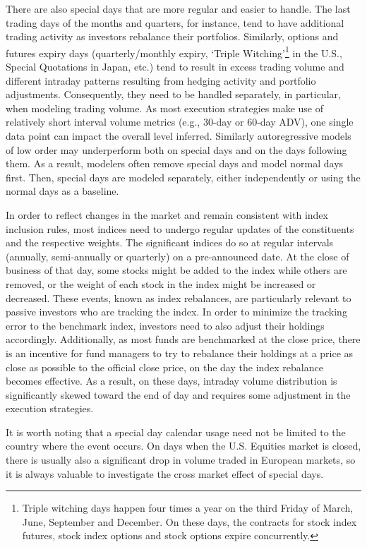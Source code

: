 \begin{itemize}
There are also special days that are more regular and easier to handle. The last trading days of the months and quarters, for instance, tend to have additional trading activity as investors rebalance their portfolios. Similarly, options and futures expiry days (quarterly/monthly expiry, `Triple Witching'\footnote{Triple witching days happen four times a year on the third Friday of March, June, September and December. On these days, the contracts for stock index futures, stock index options and stock options expire concurrently.} in the U.S., Special Quotations in Japan, etc.) tend to result in excess trading volume and different intraday patterns resulting from hedging activity and portfolio adjustments. Consequently, they need to be handled separately, in particular, when modeling trading volume. As most execution strategies make use of relatively short interval volume metrics (e.g., 30-day or 60-day ADV), one single data point can impact the overall level inferred. Similarly autoregressive models of low order may underperform both on special days and on the days following them. As a result, modelers often remove special days and model normal days first. Then, special days are modeled separately, either independently or using the normal days as a baseline. 


In order to reflect changes in the market and remain consistent with index inclusion rules, most indices need to undergo regular updates of the constituents and the respective weights. The significant indices do so at regular intervals (annually, semi-annually or quarterly) on a pre-announced date. At the close of business of that day, some stocks might be added to the index while others are removed, or the weight of each stock in the index might be increased or decreased. These events, known as index rebalances, are particularly relevant to passive investors who are tracking the index. In order to minimize the tracking error to the benchmark index, investors need to also adjust their holdings accordingly. Additionally, as most funds are benchmarked at the close price, there is an incentive for fund managers to try to rebalance their holdings at a price as close as possible to the official close price, on the day the index rebalance becomes effective. As a result, on these days, intraday volume distribution is significantly skewed toward the end of day and requires some adjustment in the execution strategies.


It is worth noting that a special day calendar usage need not be limited to the country where the event occurs. On days when the U.S. Equities market is closed, there is usually also a significant drop in volume traded in European markets, so it is always valuable to investigate the cross market effect of special days.



\end{itemize}
